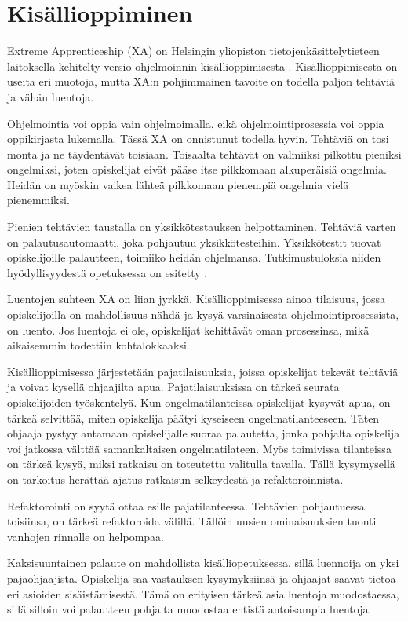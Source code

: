 \section{Kisällioppiminen}

Extreme Apprenticeship (XA) on Helsingin yliopiston tietojenkäsittelytieteen
laitoksella kehitelty versio ohjelmoinnin kisällioppimisesta
\cite{Vihavainen:2011:EAM:1953163.1953196}. Kisällioppimisesta on useita eri
muotoja, mutta XA:n pohjimmainen tavoite on todella paljon tehtäviä ja vähän
luentoja. %

Ohjelmointia voi oppia vain ohjelmoimalla, eikä ohjelmointiprosessia voi oppia
oppikirjasta lukemalla. Tässä XA on onnistunut todella hyvin. Tehtäviä on tosi
monta ja ne täydentävät toisiaan. Toisaalta tehtävät on valmiiksi pilkottu
pieniksi ongelmiksi, joten opiskelijat eivät pääse itse pilkkomaan alkuperäisiä
ongelmia. Heidän on myöskin vaikea lähteä pilkkomaan pienempiä ongelmia vielä
pienemmiksi. %

Pienien tehtävien taustalla on yksikkötestauksen helpottaminen. Tehtäviä varten
on palautusautomaatti, joka pohjautuu yksikkötesteihin. Yksikkötestit tuovat
opiskelijoille palautteen, toimiiko heidän ohjelmansa. Tutkimustuloksia niiden
hyödyllisyydestä opetuksessa on esitetty \cite{Bennedsen:2008}.

Luentojen suhteen XA on liian jyrkkä. Kisällioppimisessa ainoa tilaisuus, jossa
opiskelijoilla on mahdollisuus nähdä ja kysyä varsinaisesta
ohjelmointiprosessista, on luento. Jos luentoja ei ole, opiskelijat kehittävät
oman prosessinsa, mikä aikaisemmin todettiin kohtalokkaaksi.


Kisällioppimisessa järjestetään pajatilaisuuksia, joissa opiskelijat tekevät
tehtäviä ja voivat kysellä ohjaajilta apua. Pajatilaisuuksissa on tärkeä seurata
opiskelijoiden työskentelyä. Kun ongelmatilanteissa opiskelijat kysyvät apua, on
tärkeä selvittää, miten opiskelija päätyi kyseiseen ongelmatilanteeseen. Täten
ohjaaja pystyy antamaan opiskelijalle suoraa palautetta, jonka pohjalta
opiskelija voi jatkossa välttää samankaltaisen ongelmatilateen. Myös toimivissa
tilanteissa on tärkeä kysyä, miksi ratkaisu on toteutettu valitulla tavalla.
Tällä kysymysellä on tarkoitus herättää ajatus ratkaisun selkeydestä ja
refaktoroinnista.

Refaktorointi on syytä ottaa esille pajatilanteessa. Tehtävien pohjautuessa
toisiinsa, on tärkeä refaktoroida välillä. Tällöin uusien ominaisuuksien tuonti
vanhojen rinnalle on helpompaa.

Kaksisuuntainen palaute on mahdollista kisälliopetuksessa, sillä luennoija on
yksi pajaohjaajista. Opiskelija saa vastauksen kysymyksiinsä ja ohjaajat saavat
tietoa eri asioiden sisäistämisestä. Tämä on erityisen tärkeä asia luentoja
muodostaessa, sillä silloin voi palautteen pohjalta muodostaa entistä
antoisampia luentoja.
